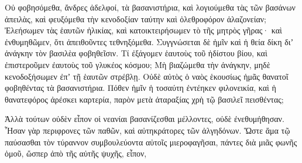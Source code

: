 {Οὐ φοβησόμεθα, ἄνδρες ἀδελφοί, τὰ βασανιστήρια, καὶ λογιούμεθα τὰς τῶν βασάνων ἀπειλὰς, καὶ φευξόμεθα τὴν κενοδοξίαν ταύτην καὶ ὀλεθροφόρον ἀλαζονείαν;
Ἐλεήσωμεν τὰς ἑαυτῶν ἡλικίας, καὶ κατοικτειρήσωμεν τὸ τῆς μητρὸς γῆρας·
καὶ ἐνθυμηθῶμεν, ὅτι ἀπειθοῦντες τεθνηξόμεθα.
Συγγνώσεται δὲ ἡμῖν καὶ ἡ θεία δίκη διʼ ἀνάγκην τὸν βασιλὲα φοβηθεῖσιν.
Τί ἐξάγομεν ἑαυτοὺς τοῦ ἡδίστου βίου, καὶ ἐπιστεροῦμεν ἐαυτοὺς τοῦ γλυκέος κόσμου;
Μὴ βιαζώμεθα τὴν ἀνάγκην, μηδὲ κενοδοξήσωμεν ἐπʼ τῇ ἑαυτῶν στρέβλῃ.
Οὐδὲ αὐτὸς ὁ ναὸς ἑκουσίως ἡμᾶς θανατοῖ φοβηθέντας τὰ βασανιστήρια.
Πόθεν ἡμῖν ἡ τοσαύτη ἐντέηκεν φιλονεικία, καὶ ἡ θανατεφόρος ἀρέσκει καρτερία, παρὸν μετὰ ἀταραξίας χρὴ τῷ βασιλεῖ πεισθέντας;
\par }{\PP {}Ἀλλὰ τούτων οὐδὲν εἶπον οἱ νεανίαι βασανίζεσθαι μέλλοντες, οὐδὲ ἐνεθυμήθησαν.
Ἦσαν γὰρ περιφρονες τῶν παθῶν, καὶ αὐτηκράτορες τῶν ἀλγηδόνων. Ὥστε ἅμα τῷ παύσασθαι τὸν τύραννον συμβουλεύοντα αὐτοῖς μιεροφαγῆσαι, πάντες διὰ μιᾶς φωνῆς ὁμοῦ, ὥσπερ ἀπὸ τῆς αὐτῆς ψυχῆς, εἶπον,

}
